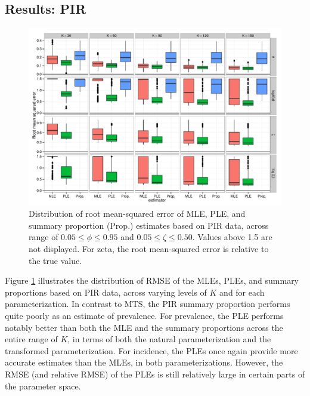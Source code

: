 \documentclass[man, noextraspace, floatsintext]{apa6}\usepackage[]{graphicx}\usepackage[]{color}
\makeatletter
\def\maxwidth{ %
  \ifdim\Gin@nat@width>\linewidth
    \linewidth
  \else
    \Gin@nat@width
  \fi
}
\newenvironment{knitrout}{}{} %
\makeatother
\begin{document}
\subsection{Results: PIR}

\begin{knitrout}
\color{fgcolor}\begin{figure}[tb]


{\centering \includegraphics[width=\maxwidth]{fig/PIR_RMSE} 

}

\caption[Distribution of root mean-squared error of MLE, PLE, and summary proportion (Prop]{Distribution of root mean-squared error of MLE, PLE, and summary proportion (Prop.) estimates based on PIR data, across range of $0.05 \leq \phi \leq 0.95$ and $0.05 \leq \zeta \leq 0.50$. Values above 1.5 are not displayed. For zeta, the root mean-squared error is relative to the true value.\label{fig:PIR_RMSE}}
\end{figure}


\end{knitrout}

Figure \ref{fig:PIR_RMSE} illustrates the distribution of RMSE of the MLEs, PLEs, and summary proportions based on PIR data, across varying levels of $K$ and for each parameterization. 
In contrast to MTS, the PIR summary proportion performs quite poorly as an estimate of prevalence. 
For prevalence, the PLE performs notably better than both the MLE and the summary proportions across the entire range of $K$, in terms of both the natural parameterization and the transformed parameterization. 
For incidence, the PLEs once again provide more accurate estimates than the MLEs, in both parameterizations. However, the RMSE (and relative RMSE) of the PLEs is still relatively large in certain parts of the parameter space.
\end{document}
